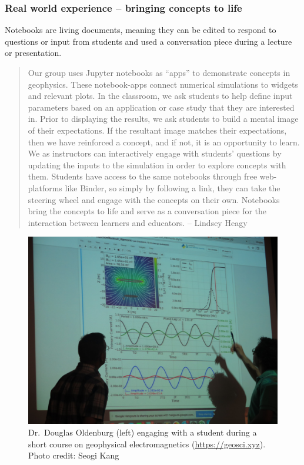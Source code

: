 \documentclass[]{book}
\begin{document}
\hypertarget{real-world-experience-bringing-concepts-to-life}{%
\subsubsection{Real world experience -- bringing concepts to life}\label{real-world-experience-bringing-concepts-to-life}}

Notebooks are living documents, meaning they can be edited to respond to
questions or input from students and used a conversation piece during a lecture
or presentation.

\begin{quote}
Our group uses Jupyter notebooks as ``apps'' to demonstrate concepts in
geophysics. These notebook-apps connect numerical simulations to widgets and
relevant plots. In the classroom, we ask students to help define input
parameters based on an application or case study that they are interested
in. Prior to displaying the results, we ask students to build a mental image
of their expectations. If the resultant image matches their expectations, then
we have reinforced a concept, and if not, it is an opportunity to learn. We as
instructors can interactively engage with students' questions by updating the
inputs to the simulation in order to explore concepts with them. Students have
access to the same notebooks through free web-platforms like Binder, so simply
by following a link, they can take the steering wheel and engage with the
concepts on their own. Notebooks bring the concepts to life and serve as a
conversation piece for the interaction between learners and educators. --
Lindsey Heagy
\end{quote}

\begin{figure}
\centering
\includegraphics{images/oldenburg-geosci.jpg}
\caption{Dr.~Douglas Oldenburg (left) engaging with a student during a short course on geophysical electromagnetics (\url{https://geosci.xyz}). Photo credit: Seogi Kang}
\end{figure}
\end{document}

